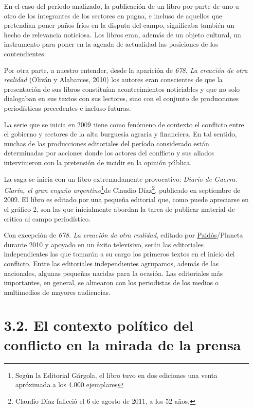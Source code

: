 En el caso del período analizado, la publicación de un libro por parte de uno u otro de los integrantes de los sectores en pugna, e incluso de aquellos que pretendían poner paños fríos en la disputa del campo, significaba también un hecho de relevancia noticiosa. Los libros eran, además de un objeto cultural, un instrumento para poner en la agenda de actualidad las posiciones de los contendientes.

Por otra parte, a nuestro entender, desde la aparición de \emph{678. La creación de otra realidad} (Oliván y Alabarces, 2010) los autores eran conscientes de que la presentación de sus libros constituían acontecimientos noticiables y que no solo dialogaban en sus textos con sus lectores, sino con el conjunto de producciones periodísticas precedentes e incluso futuras.

La serie que se inicia en 2009 tiene como fenómeno de contexto el conflicto entre el gobierno y sectores de la alta burguesía agraria y financiera. En tal sentido, muchas de las producciones editoriales del período considerado están determinadas por acciones donde los actores del conflicto y sus aliados intervinieron con la pretensión de incidir en la opinión pública.

La saga se inicia con un libro extremadamente provocativo: \emph{Diario de Guerra. Clarín, el gran engaño argentino}\footnote{Según la Editorial Gárgola, el libro tuvo en dos ediciones una venta apróximada a los 4.000 ejemplares}de Claudio Díaz\footnote{Claudio Díaz falleció el 6 de agosto de 2011, a los 52 años.}, publicado en septiembre de 2009. El libro es editado por una pequeña editorial que, como puede apreciarse en el gráfico 2, son las que inicialmente abordan la tarea de publicar material de crítica al campo periodístico.

Con excepción de \emph{678. La creación de otra realidad}, editado por \href{http://www.lecturalia.com/editoriales/79/paidos}{Paidós}/Planeta durante 2010 y apoyado en un éxito televisivo, serán las editoriales independientes las que tomarán a su cargo los primeros textos en el inicio del conflicto. Entre las editoriales independientes agrupamos, además de las nacionales, algunas pequeñas nacidas para la ocasión. Las editoriales más importantes, en general, se alinearon con los periodistas de los medios o multimedios de mayores audiencias.


\section{3.2. El contexto político del conflicto en la mirada de la prensa}

